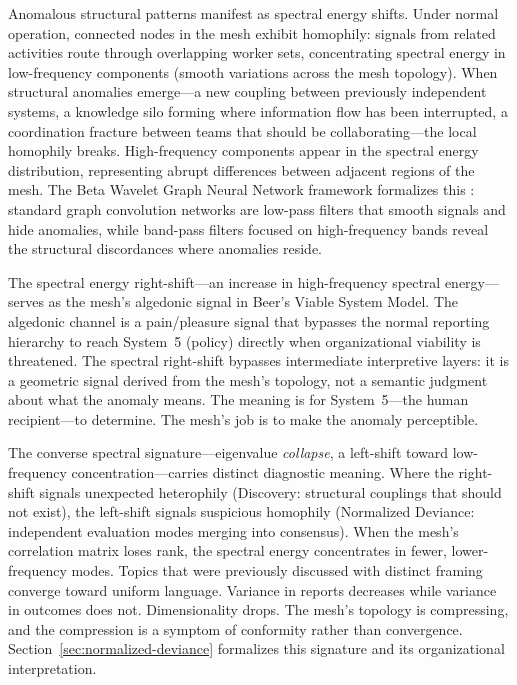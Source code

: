 \documentclass[11pt,a4paper]{article}
\begin{document}
Anomalous structural patterns manifest as spectral energy shifts. Under normal operation, connected nodes in the mesh exhibit homophily: signals from related activities route through overlapping worker sets, concentrating spectral energy in low-frequency components (smooth variations across the mesh topology). When structural anomalies emerge---a new coupling between previously independent systems, a knowledge silo forming where information flow has been interrupted, a coordination fracture between teams that should be collaborating---the local homophily breaks. High-frequency components appear in the spectral energy distribution, representing abrupt differences between adjacent regions of the mesh. The Beta Wavelet Graph Neural Network framework formalizes this \citep{tang2022}: standard graph convolution networks are low-pass filters that smooth signals and hide anomalies, while band-pass filters focused on high-frequency bands reveal the structural discordances where anomalies reside.

The spectral energy right-shift---an increase in high-frequency spectral energy---serves as the mesh's algedonic signal in Beer's Viable System Model. The algedonic channel is a pain/pleasure signal that bypasses the normal reporting hierarchy to reach System~5 (policy) directly when organizational viability is threatened. The spectral right-shift bypasses intermediate interpretive layers: it is a geometric signal derived from the mesh's topology, not a semantic judgment about what the anomaly means. The meaning is for System~5---the human recipient---to determine. The mesh's job is to make the anomaly perceptible.

The converse spectral signature---eigenvalue \emph{collapse}, a left-shift toward low-frequency concentration---carries distinct diagnostic meaning. Where the right-shift signals unexpected heterophily (Discovery: structural couplings that should not exist), the left-shift signals suspicious homophily (Normalized Deviance: independent evaluation modes merging into consensus). When the mesh's correlation matrix loses rank, the spectral energy concentrates in fewer, lower-frequency modes. Topics that were previously discussed with distinct framing converge toward uniform language. Variance in reports decreases while variance in outcomes does not. Dimensionality drops. The mesh's topology is compressing, and the compression is a symptom of conformity rather than convergence. Section~\ref{sec:normalized-deviance} formalizes this signature and its organizational interpretation.
\end{document}
